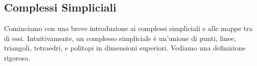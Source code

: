 \documentclass[a4paper, 12pt]{article}
\theoremstyle{definition}
\theoremstyle{remark}
\begin{document}





\subsection{Complessi Simpliciali}
Cominciamo con una breve introduzione ai complessi simpliciali e alle mappe tra di essi.
Intuitivamente, un complesso simpliciale è un'unione di punti, linee, triangoli, tetraedri, e politopi in dimensioni superiori. Vediamo una definizione rigorosa.
\end{document}
